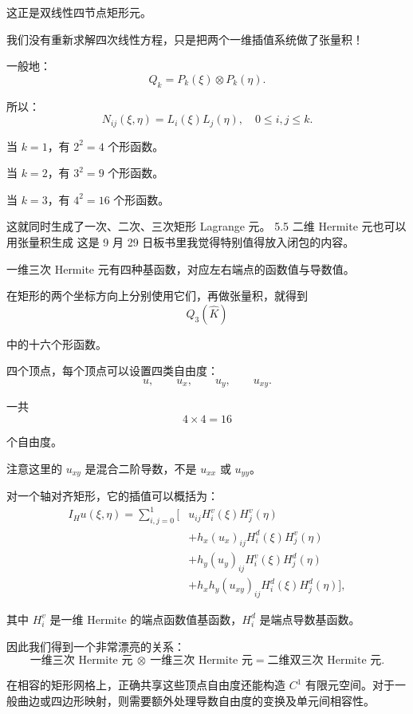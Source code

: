 这正是双线性四节点矩形元。

我们没有重新求解四次线性方程，只是把两个一维插值系统做了张量积！

一般地：
\[
    \boxed{
        Q_k=P_k(\xi)\otimes P_k(\eta).
    }
\]

所以：
\[
    \boxed{
        N_{ij}(\xi,\eta)=L_i(\xi)L_j(\eta),
        \quad 0\le i,j\le k.
    }
\]

当 \(k=1\)，有 \(2^2=4\) 个形函数。

当 \(k=2\)，有 \(3^2=9\) 个形函数。

当 \(k=3\)，有 \(4^2=16\) 个形函数。

这就同时生成了一次、二次、三次矩形 Lagrange 元。
5.5 二维 Hermite 元也可以用张量积生成
这是 9 月 29 日板书里我觉得特别值得放入闭包的内容。

一维三次 Hermite 元有四种基函数，对应左右端点的函数值与导数值。

在矩形的两个坐标方向上分别使用它们，再做张量积，就得到
\[
    \boxed{Q_3(\widehat K)}
\]

中的十六个形函数。

四个顶点，每个顶点可以设置四类自由度：
\[
    \boxed{
        u,\qquad u_x,\qquad u_y,\qquad u_{xy}.
    }
\]

一共
\[
    4\times4=16
\]

个自由度。

注意这里的 \(u_{xy}\) 是混合二阶导数，不是 \(u_{xx}\) 或 \(u_{yy}\)。

对一个轴对齐矩形，它的插值可以概括为：
\[
    \begin{aligned}
        I_Hu(\xi,\eta)
        =\sum_{i,j=0}^1\big[ &
        u_{ij}H_i^v(\xi)H_j^v(\eta)                                      \\
                             & +h_x(u_x)_{ij}H_i^d(\xi)H_j^v(\eta)       \\
                             & +h_y(u_y)_{ij}H_i^v(\xi)H_j^d(\eta)       \\
                             & +h_xh_y(u_{xy})_{ij}H_i^d(\xi)H_j^d(\eta)
            \big],
    \end{aligned}
\]

其中 \(H_i^v\) 是一维 Hermite 的端点函数值基函数，\(H_i^d\) 是端点导数基函数。

因此我们得到一个非常漂亮的关系：
\[
    \boxed{
        \text{一维三次 Hermite 元}
        \ \otimes\
        \text{一维三次 Hermite 元}
        =
        \text{二维双三次 Hermite 元}.
    }
\]

在相容的矩形网格上，正确共享这些顶点自由度还能构造 \(C^1\) 有限元空间。对于一般曲边或四边形映射，则需要额外处理导数自由度的变换及单元间相容性。

